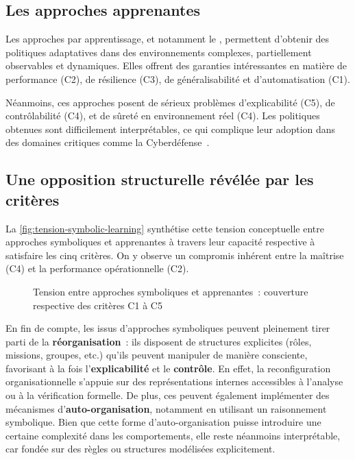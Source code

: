 \subsection{Les approches apprenantes}

Les approches par apprentissage, et notamment le , permettent d'obtenir des politiques adaptatives dans des environnements complexes, partiellement observables et dynamiques. Elles offrent des garanties intéressantes en matière de performance (C2), de résilience (C3), de généralisabilité et d'automatisation (C1).

Néanmoins, ces approches posent de sérieux problèmes d'explicabilité (C5), de contrôlabilité (C4), et de sûreté en environnement réel (C4). Les politiques obtenues sont difficilement interprétables, ce qui complique leur adoption dans des domaines critiques comme la Cyberdéfense~\cite{Gunning2019}.

\subsection{Une opposition structurelle révélée par les critères}

La \autoref{fig:tension-symbolic-learning} synthétise cette tension conceptuelle entre approches symboliques et apprenantes à travers leur capacité respective à satisfaire les cinq critères. On y observe un compromis inhérent entre la maîtrise (C4) et la performance opérationnelle (C2).

\begin{figure}[H]
  \centering
  \resizebox{\textwidth}{!}{%
    
  }
  \caption{Tension entre approches symboliques et apprenantes~: couverture respective des critères C1 à C5}
  \label{fig:tension-symbolic-learning}
\end{figure}

En fin de compte, les  issus d'approches symboliques peuvent pleinement tirer parti de la \textbf{réorganisation}~: ils disposent de structures explicites (rôles, missions, groupes, etc.) qu'ils peuvent manipuler de manière consciente, favorisant à la fois l'\textbf{explicabilité} et le \textbf{contrôle}. En effet, la reconfiguration organisationnelle s'appuie sur des représentations internes accessibles à l'analyse ou à la vérification formelle. De plus, ces  peuvent également implémenter des mécanismes d'\textbf{auto-organisation}, notamment en utilisant un raisonnement symbolique. Bien que cette forme d'auto-organisation puisse introduire une certaine complexité dans les comportements, elle reste néanmoins interprétable, car fondée sur des règles ou structures modélisées explicitement.

